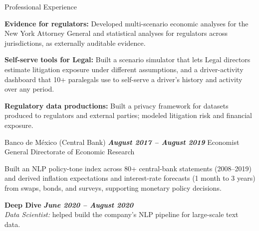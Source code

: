 \documentclass{resume} %
\begin{document}
\begin{rSection}{Professional Experience}
\begin{rSubsection}
    \item \textbf{Evidence for regulators:} Developed multi-scenario economic
    analyses for the New York Attorney General and statistical analyses for
    regulators across jurisdictions, as externally auditable evidence.

    \item \textbf{Self-serve tools for Legal:} Built a scenario simulator that
    lets Legal directors estimate litigation exposure under different
    assumptions, and a driver-activity dashboard that 10+ paralegals use to
    self-serve a driver's history and activity over any period.

    \item \textbf{Regulatory data productions:} Built a privacy framework for
    datasets produced to regulators and external parties; modeled litigation
    risk and financial exposure.

\end{rSubsection}


\begin{rSubsection}
    {Banco de México (Central Bank)}
    {\textbf{\emph{August 2017 -- August 2019}}}
    {Economist}
    {General Directorate of Economic Research}

    \item Built an NLP policy-tone index across 80+ central-bank statements
    (2008--2019) and derived inflation expectations and interest-rate
    forecasts (1 month to 3 years) from swaps, bonds, and surveys, supporting
    monetary policy decisions.

\end{rSubsection}


\textbf{Deep Dive}
\hfill
\textbf{\emph{June 2020 -- August 2020}}
\\
\textit{Data Scientist:} helped build the company's NLP pipeline for
large-scale text data.

\end{rSection}

\end{document}
